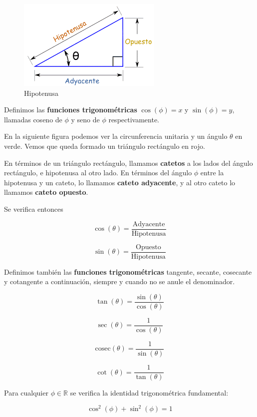 \begin{figure}[h]
\centering\includegraphics[scale=0.6]{images/01_precalculo/hipotenusa.png}
\caption{Hipotenusa}
\end{figure}

\begin{definition}
Definimos las \textbf{funciones trigonométricas} $\cos(\phi) = x$ y $\sin(\phi) = y$, llamadas coseno de $\phi$ y seno de $\phi$ respectivamente.

En la siguiente figura podemos ver la circunferencia unitaria y un ángulo $\theta$ en verde.  Vemos que queda formado un triángulo rectángulo en rojo.


En términos de un triángulo rectángulo, llamamos \textbf{catetos} a los lados del ángulo rectángulo, e hipotenusa al otro lado.  En términos del ángulo $\phi$ entre la hipotenusa y un cateto, lo llamamos \textbf{cateto adyacente}, y al otro cateto lo llamamos \textbf{cateto opuesto}.

Se verifica entonces

$$\cos(\theta) = \frac{\textrm{Adyacente}}{\textrm{Hipotenusa}}$$

$$\sin(\theta) = \frac{\textrm{Opuesto}}{\textrm{Hipotenusa}}$$

Definimos también las \textbf{funciones trigonométricas} tangente, secante, cosecante y cotangente a continuación, siempre y cuando no se anule el denominador.

$$ \tan(\theta) = \frac{\sin(\theta)}{\cos(\theta)}$$

$$ \sec(\theta) = \frac{1}{\cos(\theta)}$$

$$ \mathrm{cosec}(\theta) = \frac{1}{\sin(\theta)}$$

$$ \cot(\theta) = \frac{1}{\tan(\theta)}$$

\end{definition}

\begin{observation} 
Para cualquier $\phi \in \mathbb{R}$ se verifica la identidad trigonométrica fundamental:

$$ \cos^2(\phi) + \sin^2(\phi) = 1$$
\end{observation}

